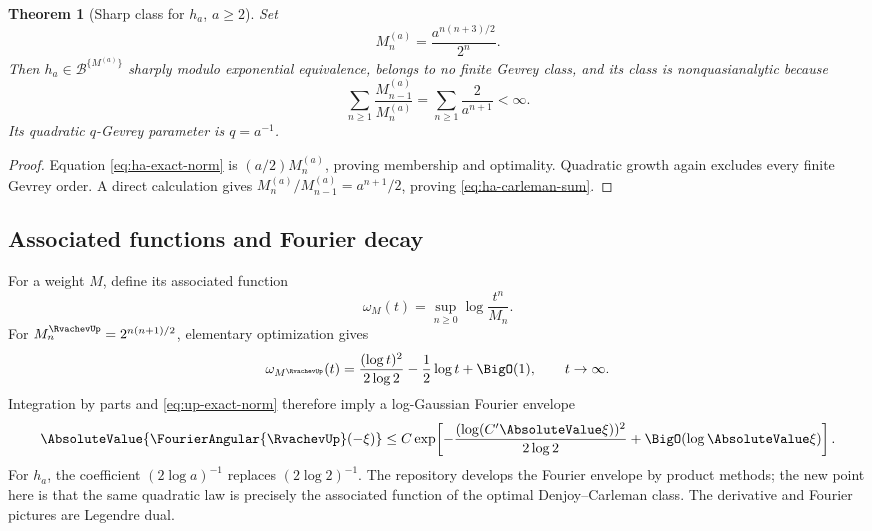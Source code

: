 \documentclass[11pt]{article}
\numberwithin{equation}{section}
\newtheorem{theorem}{Theorem}[section]
\theoremstyle{definition}
\begin{document}
\begin{theorem}[Sharp class for \(h_a\), \(a\ge2\)]\label{thm:carleman-ha}
Set
\begin{equation}\label{eq:Ma}
 M_n^{(a)}=\frac{a^{n(n+3)/2}}{2^n}.
\end{equation}
Then \(h_a\in\mathcal B^{\{M^{(a)}\}}\) sharply modulo exponential equivalence, belongs to no finite Gevrey class, and its class is nonquasianalytic because
\begin{equation}\label{eq:ha-carleman-sum}
 \sum_{n\ge1}\frac{M_{n-1}^{(a)}}{M_n^{(a)}}
 =\sum_{n\ge1}\frac{2}{a^{n+1}}<\infty.
\end{equation}
Its quadratic \(q\)-Gevrey parameter is \(q=a^{-1}\).
\end{theorem}

\begin{proof}
Equation \eqref{eq:ha-exact-norm} is \((a/2)M_n^{(a)}\), proving membership and optimality.  Quadratic growth again excludes every finite Gevrey order.  A direct calculation gives \(M_n^{(a)}/M_{n-1}^{(a)}=a^{n+1}/2\), proving \eqref{eq:ha-carleman-sum}.
\end{proof}

\subsection{Associated functions and Fourier decay}
For a weight \(M\), define its associated function
\begin{equation}\label{eq:associated-function}
 \omega_M(t)=\sup_{n\ge0}\log\frac{t^n}{M_n}.
\end{equation}
For \(M_n^{\RvachevUp}=2^{n(n+1)/2}\), elementary optimization gives
\begin{equation}\label{eq:omega-up}
 \omega_{M^{\RvachevUp}}(t)
 =\frac{(\log t)^2}{2\log2}-\frac12\log t+\BigO(1),
 \qquad t\to\infty.
\end{equation}
Integration by parts and \eqref{eq:up-exact-norm} therefore imply a log-Gaussian Fourier envelope
\begin{equation}\label{eq:fourier-from-carleman}
 \AbsoluteValue{\FourierAngular{\RvachevUp}(-\xi)}
 \le C\exp\!\left[-\frac{(\log(C'\AbsoluteValue\xi))^2}{2\log2}
 +\BigO(\log\AbsoluteValue\xi)\right].
\end{equation}
For \(h_a\), the coefficient \((2\log a)^{-1}\) replaces \((2\log2)^{-1}\).  The repository develops the Fourier envelope by product methods; the new point here is that the same quadratic law is precisely the associated function of the optimal Denjoy--Carleman class.  The derivative and Fourier pictures are Legendre dual.
\end{document}
